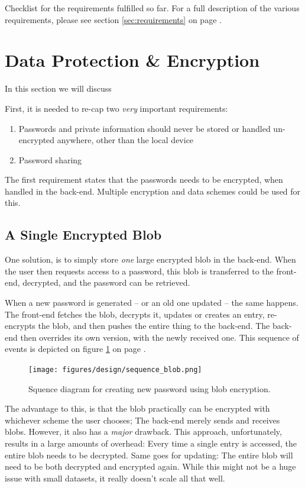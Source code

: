\begin{table}
				\caption{Checklist for the requirements fulfilled so far. For a full description of the various requirements, please see section \ref{sec:requirements} on page \pageref{sec:requirements}.}
				\label{tab:checklist_arch-comms}
			\end{table}

	\section{Data Protection \& Encryption}
		In this section we will discuss	


		First, it is needed to re-cap two \emph{very} important requirements:
		\begin{enumerate}
			\item Passwords and private information should never be stored or handled un-encrypted anywhere, other than the local device
			\item Password sharing
		\end{enumerate}

		The first requirement states that the passwords needs to be encrypted, when handled in the back-end. Multiple encryption and data schemes could be used for this.

		\subsection{A Single Encrypted Blob}
			One solution, is to simply store \emph{one} large encrypted blob in the back-end. When the user then requests access to a password, this blob is transferred to the front-end, decrypted, and the password can be retrieved. 

			When a new password is generated -- or an old one updated -- the same happens. The front-end fetches the blob, decrypts it, updates or creates an entry, re-encrypts the blob, and then pushes the entire thing to the back-end. The back-end then overrides its own version, with the newly received one. This sequence of events is depicted on figure \ref{fig:seq_blob} on page \pageref{fig:seq_blob}.

			\begin{figure}[h!]
				\centering
				\texttt{[image: figures/design/sequence\_blob.png]}
				\caption{Squence diagram for creating new password using blob encryption.}
				\label{fig:seq_blob}
			\end{figure}

			The advantage to this, is that the blob practically can be encrypted with whichever scheme the user chooses; The back-end merely sends and receives blobs. However, it also has a \emph{major} drawback. This approach, unfortunately, results in a large amounts of overhead: Every time a single entry is accessed, the entire blob needs to be decrypted. Same goes for updating: The entire blob will need to be both decrypted and encrypted again. While this might not be a huge issue with small datasets, it really doesn't scale all that well.

